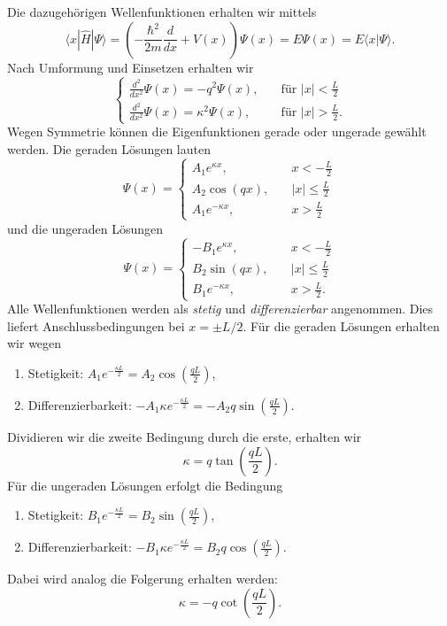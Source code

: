 Die dazugehörigen Wellenfunktionen erhalten wir mittels
\begin{equation}
	\langle x|\widehat{H}|\Psi\rangle = \left(-\frac{\hbar^2}{2m}\frac{d}{dx} + V(x)\right)\Psi(x) = E\Psi(x) = E\langle x|\Psi\rangle.
\end{equation}
Nach Umformung und Einsetzen erhalten wir
\begin{equation}
	\begin{cases}
		\frac{d^2}{dx^2}\Psi(x) = -q^2 \Psi(x), \quad &\text{für $|x|<\frac{L}{2}$}\\
		\frac{d^2}{dx^2}\Psi(x) = \kappa^2 \Psi(x), \quad &\text{für $|x|>\frac{L}{2}$}.
	\end{cases}
\end{equation}
Wegen Symmetrie können die Eigenfunktionen gerade oder ungerade gewählt werden. Die geraden Lösungen lauten
\begin{equation}
	\Psi(x) = \begin{cases}
		A_1 e^{\kappa x}, \quad & x< -\frac{L}{2} \\
		A_2 \cos(qx), \quad & |x| \le \frac{L}{2} \\
		A_1 e^{-\kappa x}, \quad & x> \frac{L}{2}
	\end{cases}
\end{equation}
und die ungeraden Lösungen
\begin{equation}
	\Psi(x) = \begin{cases}
		-B_1 e^{\kappa x}, \quad & x< -\frac{L}{2} \\
		B_2 \sin(qx), \quad & |x| \le \frac{L}{2} \\
		B_1 e^{-\kappa x}, \quad & x> \frac{L}{2}.
	\end{cases}
\end{equation}
Alle Wellenfunktionen werden als \emph{stetig} und \emph{differenzierbar} angenommen. Dies liefert Anschlussbedingungen bei $x = \pm L/2$. Für die geraden Lösungen erhalten wir wegen
\begin{enumerate}
	\item Stetigkeit: $A_1 e^{-\frac{\kappa L}{2}} = A_2 \cos\left(\frac{qL}{2}\right)$,
	\item Differenzierbarkeit: $-A_1\kappa e^{-\frac{\kappa L}{2}} = -A_2 q\sin\left(\frac{qL}{2}\right)$.
\end{enumerate}
Dividieren wir die zweite Bedingung durch die erste, erhalten wir
\begin{equation}\label{eq:symmcond}
	\kappa = q\tan\left(\frac{qL}{2}\right).
\end{equation}
Für die ungeraden Lösungen erfolgt die Bedingung  
\begin{enumerate}
	\item Stetigkeit: $B_1 e^{-\frac{\kappa L}{2}} = B_2 \sin\left(\frac{qL}{2}\right)$,
	\item Differenzierbarkeit: $-B_1\kappa e^{-\frac{\kappa L}{2}} = B_2 q\cos\left(\frac{qL}{2}\right)$.
\end{enumerate}
Dabei wird analog die Folgerung erhalten werden:
\begin{equation}\label{eq:unsymm}
	\kappa = -q\cot\left(\frac{qL}{2}\right).
\end{equation}

